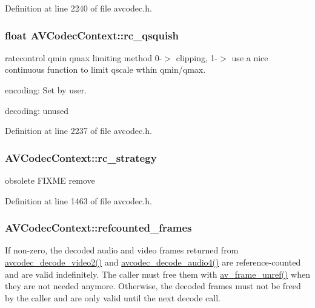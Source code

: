 Definition at line 2240 of file avcodec.\+h.

\subsubsection[{\texorpdfstring{rc\+\_\+qsquish}{rc_qsquish}}]{\setlength{\rightskip}{0pt plus 5cm}float A\+V\+Codec\+Context\+::rc\+\_\+qsquish}\hypertarget{struct_a_v_codec_context_a86d7bef19235330f23d21cf65c01a956}{}\label{struct_a_v_codec_context_a86d7bef19235330f23d21cf65c01a956}
ratecontrol qmin qmax limiting method 0-\/$>$ clipping, 1-\/$>$ use a nice continuous function to limit qscale wthin qmin/qmax.
\begin{DoxyItemize}
\item encoding\+: Set by user.
\item decoding\+: unused 
\end{DoxyItemize}

Definition at line 2237 of file avcodec.\+h.

\subsubsection[{\texorpdfstring{rc\+\_\+strategy}{rc_strategy}}]{ A\+V\+Codec\+Context\+::rc\+\_\+strategy}\hypertarget{struct_a_v_codec_context_aa243eb5ac9606ee7d0e1e8402ffcb289}{}\label{struct_a_v_codec_context_aa243eb5ac9606ee7d0e1e8402ffcb289}
obsolete F\+I\+X\+ME remove 

Definition at line 1463 of file avcodec.\+h.

\subsubsection[{\texorpdfstring{refcounted\+\_\+frames}{refcounted_frames}}]{ A\+V\+Codec\+Context\+::refcounted\+\_\+frames}\hypertarget{struct_a_v_codec_context_ab16d1e0c729a7b63d918d5ec027ba064}{}\label{struct_a_v_codec_context_ab16d1e0c729a7b63d918d5ec027ba064}
If non-\/zero, the decoded audio and video frames returned from \hyperlink{group__lavc__decoding_ga99ee61b6dcffb7817a275d39da58cc74}{avcodec\+\_\+decode\+\_\+video2()} and \hyperlink{group__lavc__decoding_ga834bb1b062fbcc2de4cf7fb93f154a3e}{avcodec\+\_\+decode\+\_\+audio4()} are reference-\/counted and are valid indefinitely. The caller must free them with \hyperlink{group__lavu__frame_ga0a2b687f9c1c5ed0089b01fd61227108}{av\+\_\+frame\+\_\+unref()} when they are not needed anymore. Otherwise, the decoded frames must not be freed by the caller and are only valid until the next decode call.


